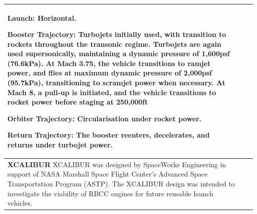 {\begin{landscape}
\begin{xltabular}{\linewidth}{|X|X|X|}
	\textbf{Launch:} Horizontal.
	
	\textbf{Booster Trajectory:} Turbojets initially used, with transition to rockets throughout the transonic regime. Turbojets are again used supersonically, maintaining a dynamic pressure of 1,600psf (76.6kPa). At Mach 3.75, the vehicle transitions to ramjet power, and flies at maximum dynamic pressure of 2,000psf (95.7kPa), transitioning to scramjet power when necessary. At Mach 8, a pull-up is initiated, and the vehicle transitions to rocket power before staging at 250,000ft
	
	\textbf{Orbiter Trajectory:}  Circularisation under rocket power. 
	
	\textbf{Return Trajectory:} The booster reenters, decelerates, and returns under turbojet power.  
	\\
	
	\hline \small 
	\textbf{XCALIBUR}\cite{Bradford2002}\newline\newline
	XCALIBUR was designed by SpaceWorks Engineering in support of NASA Marshall Space Flight Center’s Advanced Space Transportation Program (ASTP). The XCALIBUR design was intended to investigate the viability of RBCC engines for future reusable launch vehicles. 
	&\small
	

\end{xltabular}
\end{landscape}}
